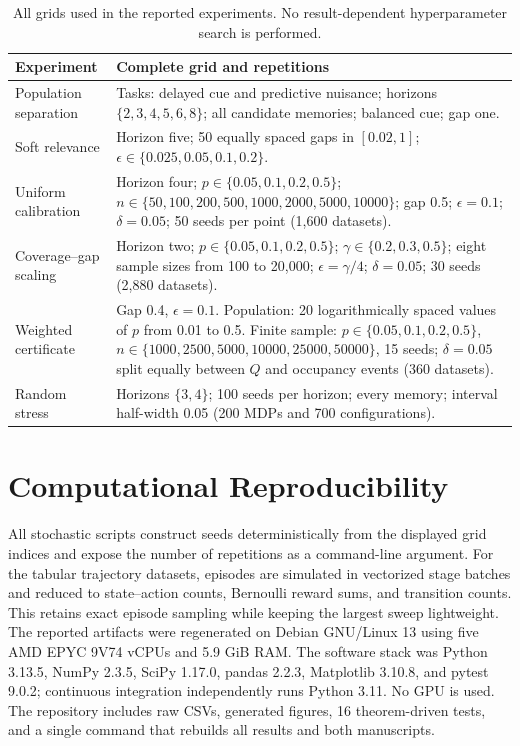 \documentclass[letterpaper]{article} %
\begin{document}
\begin{table}[t]
\centering
\small
\begin{tabular}{p{}p{}}
\toprule
Experiment & Complete grid and repetitions \\
\midrule
Population separation & Tasks: delayed cue and predictive nuisance; horizons
\(\{2,3,4,5,6,8\}\); all candidate memories; balanced cue; gap one. \\
Soft relevance & Horizon five; 50 equally spaced gaps in \([0.02,1]\);
\(\epsilon\in\{0.025,0.05,0.1,0.2\}\). \\
Uniform calibration & Horizon four; \(p\in\{0.05,0.1,0.2,0.5\}\);
\(n\in\{50,100,200,500,1000,2000,5000,10000\}\); gap 0.5;
\(\epsilon=0.1\); \(\delta=0.05\); 50 seeds per point (1,600 datasets). \\
Coverage--gap scaling & Horizon two;
\(p\in\{0.05,0.1,0.2,0.5\}\);
\(\gamma\in\{0.2,0.3,0.5\}\); eight sample sizes from 100 to 20,000;
\(\epsilon=\gamma/4\); \(\delta=0.05\); 30 seeds (2,880 datasets). \\
Weighted certificate & Gap 0.4, \(\epsilon=0.1\).  Population:
20 logarithmically spaced values of \(p\) from 0.01 to 0.5.  Finite sample:
\(p\in\{0.05,0.1,0.2,0.5\}\),
\(n\in\{1000,2500,5000,10000,25000,50000\}\), 15 seeds;
\(\delta=0.05\) split equally between \(Q\) and occupancy events
(360 datasets). \\
Random stress & Horizons \(\{3,4\}\); 100 seeds per horizon; every memory;
interval half-width 0.05 (200 MDPs and 700 configurations). \\
\bottomrule
\end{tabular}
\caption{All grids used in the reported experiments.  No result-dependent
hyperparameter search is performed.}
\label{tab:grids}
\end{table}

\section{Computational Reproducibility}

All stochastic scripts construct seeds deterministically from the displayed
grid indices and expose the number of repetitions as a command-line argument.
For the tabular trajectory datasets, episodes are simulated in vectorized
stage batches and reduced to state--action counts, Bernoulli reward sums, and
transition counts.  This retains exact episode sampling while keeping the
largest sweep lightweight.
The reported artifacts were regenerated on Debian GNU/Linux 13 using five
AMD EPYC 9V74 vCPUs and 5.9 GiB RAM.  The software
stack was Python 3.13.5, NumPy 2.3.5, SciPy 1.17.0, pandas 2.2.3, Matplotlib
3.10.8, and pytest 9.0.2; continuous integration independently runs Python
3.11.  No GPU is used.  The repository includes raw CSVs, generated figures,
16 theorem-driven tests, and a single command that rebuilds all results and
both manuscripts.
\end{document}
